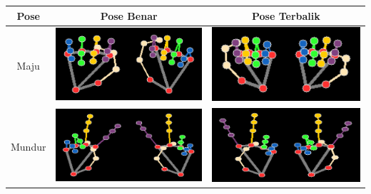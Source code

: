 \begin{table}[H]
  \centering
  \begin{tabular}{|c|c|c|}
  \hline
  Pose   &Pose Benar&Pose Terbalik\\ \hline
  Maju   & \includegraphics[width=0.4\linewidth]{../Gambar/Maju (1).png} & \includegraphics[width=0.4\linewidth]{../Gambar/MajuI (1).png} \\ \hline
  Mundur & \includegraphics[width=0.4\linewidth]{../Gambar/Mundur (1).png} & \includegraphics[width=0.4\linewidth]{../Gambar/MundurI (1).png} \\ \hline
  \end{tabular}
\end{table}

